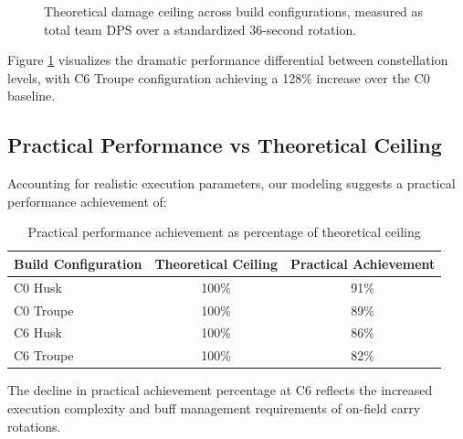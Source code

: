 \documentclass[12pt,a4paper]{article}
\begin{document}
\begin{figure}[H]
\centering
{}
\caption{Theoretical damage ceiling across build configurations, measured as total team DPS over a standardized 36-second rotation.}
\label{fig:damage_ceiling}
\end{figure}

Figure \ref{fig:damage_ceiling} visualizes the dramatic performance differential between constellation levels, with C6 Troupe configuration achieving a 128\% increase over the C0 baseline.

\subsection{Practical Performance vs Theoretical Ceiling}

Accounting for realistic execution parameters, our modeling suggests a practical performance achievement of:

\begin{table}[h]
\centering
\begin{tabular}{lcc}
\toprule
\textbf{Build Configuration} & \textbf{Theoretical Ceiling} & \textbf{Practical Achievement} \\
\midrule
C0 Husk & 100\% & 91\% \\
C0 Troupe & 100\% & 89\% \\
C6 Husk & 100\% & 86\% \\
C6 Troupe & 100\% & 82\% \\
\bottomrule
\end{tabular}
\caption{Practical performance achievement as percentage of theoretical ceiling}
\label{tab:practical_performance}
\end{table}

The decline in practical achievement percentage at C6 reflects the increased execution complexity and buff management requirements of on-field carry rotations.
\end{document}
